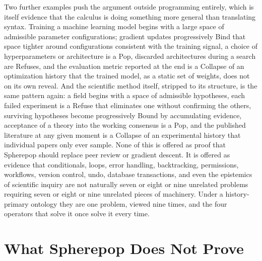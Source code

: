 \documentclass[11pt]{article}
\begin{document}
Two further examples push the argument outside programming entirely, which is itself evidence that the calculus is doing something more general than translating syntax. Training a machine learning model begins with a large space of admissible parameter configurations; gradient updates progressively Bind that space tighter around configurations consistent with the training signal, a choice of hyperparameters or architecture is a Pop, discarded architectures during a search are Refuses, and the evaluation metric reported at the end is a Collapse of an optimization history that the trained model, as a static set of weights, does not on its own reveal. And the scientific method itself, stripped to its structure, is the same pattern again: a field begins with a space of admissible hypotheses, each failed experiment is a Refuse that eliminates one without confirming the others, surviving hypotheses become progressively Bound by accumulating evidence, acceptance of a theory into the working consensus is a Pop, and the published literature at any given moment is a Collapse of an experimental history that individual papers only ever sample. None of this is offered as proof that Spherepop should replace peer review or gradient descent. It is offered as evidence that conditionals, loops, error handling, backtracking, permissions, workflows, version control, undo, database transactions, and even the epistemics of scientific inquiry are not naturally seven or eight or nine unrelated problems requiring seven or eight or nine unrelated pieces of machinery. Under a history-primary ontology they are one problem, viewed nine times, and the four operators that solve it once solve it every time.

\section{What Spherepop Does Not Prove}
\end{document}
